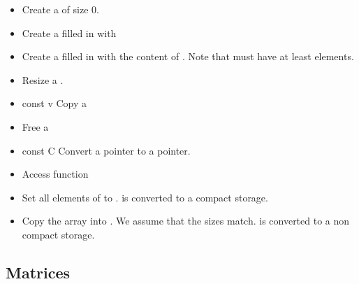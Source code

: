 \begin{itemize}
  \item {}
  \sshortdescribe Create a \PnlVectCompact of size 0.  

\item {}
  \sshortdescribe Create a \PnlVectCompact filled in with 
\item {}
  \sshortdescribe Create a \PnlVectCompact filled in with the content of
  . Note that  must have at least  elements.

\item {} 
  \sshortdescribe Resize a \PnlVectCompact.  

\item {} {const \PnlVectCompact\ptr v}
  \sshortdescribe Copy a \PnlVectCompact  

\item {}
  \sshortdescribe Free a \PnlVectCompact  

\item {}
  {const \PnlVectCompact \ptr C} 
  \sshortdescribe Convert a \PnlVectCompact pointer to a \PnlVect pointer.  

\item {}
  \sshortdescribe Access function

\item {}
  \sshortdescribe Set all elements of  to .  is
  converted to a compact storage.
  
\item {}
  \sshortdescribe Copy the array  into . We assume that the
  sizes match.  is converted to a non compact storage.
\end{itemize}


\subsection{Matrices}
